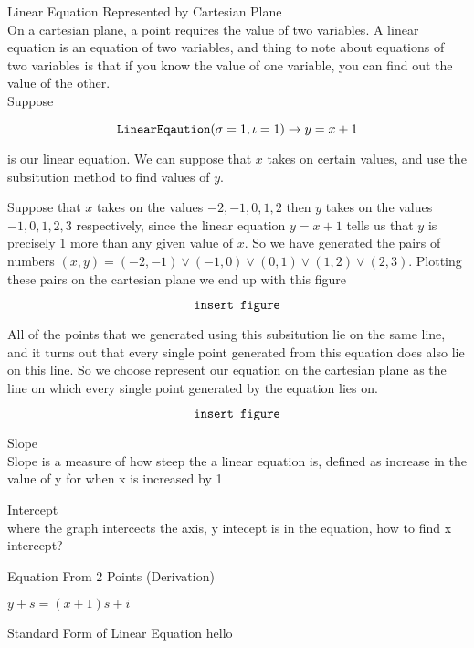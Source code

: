 \documentclass{book}
\begin{document}
  {\remark Linear Equation Represented by Cartesian Plane \\
    On a cartesian plane, a point requires the value of two variables. A linear equation is an equation of two variables, and thing to note about equations of two variables is that if you know the value of one variable, you can find out the value of the other.\\

    Suppose

    $$\text{\texttt{LinearEqaution}}(\sigma = 1, \iota = 1) \to y = x + 1$$

    is our linear equation. We can suppose that $x$ takes on certain values, and use the subsitution method to find values of $y$.

    Suppose that $x$ takes on the values $-2, -1, 0, 1, 2$ then $y$ takes on the values $-1, 0, 1, 2, 3$ respectively, since the linear equation $y = x + 1$ tells us that $y$ is precisely 1 more than any given value of $x$. So we have generated the pairs of numbers $(x, y) = (-2, -1) \lor (-1, 0) \lor (0, 1) \lor (1, 2) \lor (2, 3)$. Plotting these pairs on the cartesian plane we end up with this figure

    $$\text{\texttt{insert figure}}$$

    All of the points that we generated using this subsitution lie on the same line, and it turns out that every single point generated from this equation does also lie on this line. So we choose represent our equation on the cartesian plane as the line on which every single point generated by the equation lies on.

    $$\text{\texttt{insert figure}}$$
  }


  {\remark Slope \\
    Slope is a measure of how steep the a linear equation is, defined as increase in the value of y for when x is increased by 1\\
  }

  {

  }


  {\remark Intercept \\
    where the graph intercects the axis, y intecept is in the equation, how to find x intercept?
  }

  {\remark Equation From 2 Points (Derivation)

    $y + s = (x + 1)s + i$
  }


  {\remark Standard Form of Linear Equation 
    hello
  }
\end{document}
